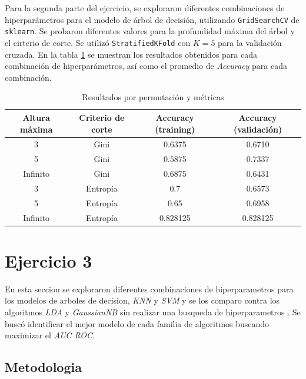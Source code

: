 \documentclass[10pt,a4paper]{article}
\begin{document}
Para la segunda parte del ejercicio, se exploraron diferentes combinaciones de hiperparámetros para el modelo de árbol de decisión, utilizando \texttt{GridSearchCV} de \texttt{sklearn}.
 Se probaron diferentes valores para la profundidad máxima del árbol y el cirterio de corte. Se utilizó \texttt{StratifiedKFold} con $K=5$ para la validación cruzada.
En la tabla \ref{tab:resultados-arbol-gridsearch-1} se muestran los resultados obtenidos para cada combinación de hiperparámetros, así como el promedio de \textit{Accuracy} para cada combinación.
 \begin{table}[H]
    \centering
    \begin{tabular}{|c|c|c|c|}
    \hline
    \textbf{Altura máxima} & \textbf{Criterio de corte} &\textbf{Accuracy} (training) &\textbf{Accuracy} (validación)  \\
    \hline
    3 & Gini   & 0.6375 & 0.6710  \\
    \hline
    5 & Gini & 0.5875 & 0.7337  \\
    \hline
    Infinito & Gini    & 0.6875 & 0.6431 \\
    \hline
    3 & Entropía & 0.7    & 0.6573  \\
    \hline
    5 & Entropía  & 0.65   & 0.6958  \\
    \hline  
    Infinito &  Entropía &  0.828125 &  0.828125 \\
    \hline
    \end{tabular}
    \caption{Resultados por permutación y métricas}
    \label{tab:resultados-arbol-gridsearch-1}
\end{table}

\section{Ejercicio 3}

En esta seccion se exploraron diferentes combinaciones de hiperparametros para los modelos de arboles de decision, \textit{KNN} y \textit{SVM} y se los comparo contra los algoritmos \textit{LDA} y \textit{GaussianNB} sin realizar una busqueda de hiperparametros
. Se buscó identificar el mejor modelo de cada familia de algoritmos buscando maximizar el \textit{AUC ROC}.

\subsection{Metodologia} \label{subsec:metodologia}
\end{document}
